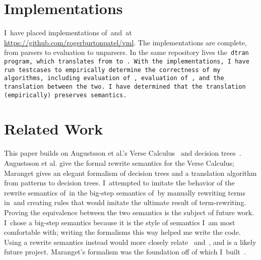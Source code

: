 \documentclass[manuscript,screen 12pt, nonacm]{acmart}
\begin{document}
        
    

    \section{Implementations}

    I~have placed implementations of~\VMinus and~\D at
    \url{https://github.com/rogerburtonpatel/vml}. The implementations are
    complete, from parsers to evaluation to unparsers. In the same repository
    lives the~\tt{dtran} program, which translates from~\VMinus to~\D. With the
    implementations, I~have run testcases to empirically determine the
    correctness of my algorithms, including evaluation of~\VMinus, evaluation
    of~\D, and the translation between the two. I~have determined that the
    translation (empirically) preserves semantics. 


    \section{Related Work}

    This paper builds on Augustsson et al.'s Verse Calculus~\citep{verse} and
    decision trees~\citep{maranget}. Augustsson et al. give the formal rewrite
    semantics for the Verse Calculus; Maranget gives an elegant formalism of
    decision trees and a translation algorithm from patterns to decision trees.
    I~attempted to imitate the behavior of the rewrite semantics of~\VC in the
    big-step semantics of~\VMinus by manually rewriting terms in~\VC and
    creating rules that would imitate the ultimate result of term-rewriting.
    Proving the equivalence between the two semantics is the subject of future
    work. I~chose a big-step semantics because it is the style of semantics I~am
    most comfortable with; writing the formalisms this way helped me write the
    code. Using a rewrite semantics instead would more closely relate~\VMinus
    and~\VC, and is a likely future project. Maranget's formalism was the
    foundation off of which I~built~\D. 
    
\end{document}
